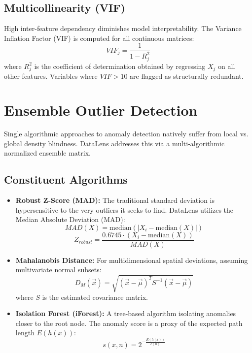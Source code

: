 \documentclass[conference]{IEEEtran}
\begin{document}
\subsection{Multicollinearity (VIF)}
High inter-feature dependency diminishes model interpretability. The Variance Inflation Factor (VIF) is computed for all continuous matrices:
\begin{equation}
    VIF_j = \frac{1}{1 - R_j^2}
\end{equation}
where $R_j^2$ is the coefficient of determination obtained by regressing $X_j$ on all other features. Variables where $VIF > 10$ are flagged as structurally redundant.

\section{Ensemble Outlier Detection}\label{sec:outliers}
Single algorithmic approaches to anomaly detection natively suffer from local vs. global density blindness. DataLens addresses this via a multi-algorithmic normalized ensemble matrix.

\subsection{Constituent Algorithms}
\begin{itemize}
    \item \textbf{Robust Z-Score (MAD):}
    The traditional standard deviation is hypersensitive to the very outliers it seeks to find. DataLens utilizes the Median Absolute Deviation (MAD):
    \begin{equation}
        MAD(X) = \mathrm{median}(|X_i - \mathrm{median}(X)|)
    \end{equation}
    \begin{equation}
        Z_{robust} = \frac{0.6745 \cdot (X_i - \mathrm{median}(X))}{MAD(X)}
    \end{equation}
    
    \item \textbf{Mahalanobis Distance:}
    For multidimensional spatial deviations, assuming multivariate normal subsets:
    \begin{equation}
        D_M(\vec{x}) = \sqrt{(\vec{x} - \vec{\mu})^T S^{-1} (\vec{x} - \vec{\mu})}
    \end{equation}
    where $S$ is the estimated covariance matrix.
    
    \item \textbf{Isolation Forest (iForest):}
    A tree-based algorithm isolating anomalies closer to the root node. The anomaly score is a proxy of the expected path length $E(h(x))$:
    \begin{equation}
        s(x, n) = 2^{-\frac{E(h(x))}{c(n)}}
    \end{equation}
\end{itemize}
\end{document}
